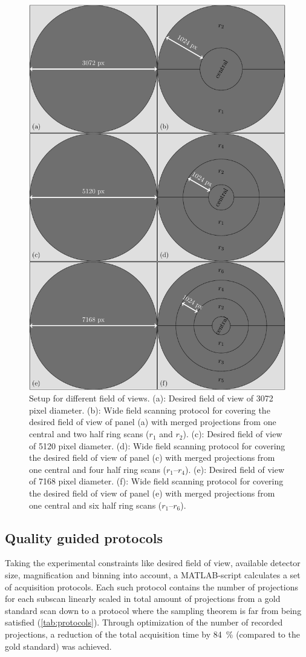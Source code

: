 \begin{figure}
	\centering
	\includegraphics[width=.8\linewidth]{img/Haberthuer2010/Fig03-3-5-7}
	\caption[Setup for different field of views]{Setup for different field of views. %
		(a): Desired field of view of 3072 pixel diameter. %
		(b): Wide field scanning protocol for covering the desired field of view of panel (a) with merged projections from one central and two half ring scans ($r_{1}$ and $r_{2}$). %
		(c): Desired field of view of 5120 pixel diameter. %
		(d): Wide field scanning protocol for covering the desired field of view of panel (c) with merged projections from one central and four half ring scans ($r_{1}$--$r_{4}$). %
		(e): Desired field of view of 7168 pixel diameter. %
		(f): Wide field scanning protocol for covering the desired field of view of panel (e) with merged projections from one central and six half ring scans ($r_{1}$--$r_{6}$).}%
	\label{fig:SubScan-Setup}
\end{figure}

\subsection{Quality guided protocols}\label{sec:quality guided protocols}
Taking the experimental constraints like desired field of view, available detector size, magnification and binning into account, a MATLAB-script calculates a set of acquisition protocols. Each such protocol contains the number of projections for each subscan linearly scaled in total amount of projections from a gold standard scan down to a protocol where the sampling theorem is far from being satisfied (\autoref{tab:protocols}). Through optimization of the number of recorded projections, a reduction of the total acquisition time by \SI{84}{\percent} (compared to the gold standard) was achieved.

